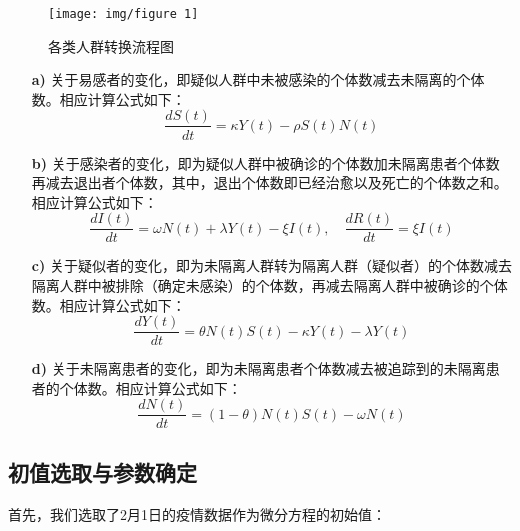 \documentclass[UTF8]{ctexart}
\begin{document}
		
		\begin{figure}[!htbp]\centering
		\texttt{[image: img/figure 1]} %
		\caption{各类人群转换流程图} %
		\label{fig:figure 1} %
		\end{figure}	
		
		
		
	
		
		\vspace{4pt}
		\begin{itemize}
			\item [\textbf{a)}]关于易感者的变化，即疑似人群中未被感染的个体数减去未隔离的个体数。相应计算公式如下：\vspace{1ex}
				\begin{equation}
				\frac{dS(t)}{dt}=\kappa Y(t)-\rho S(t)N(t)
				\end{equation}
				
				
				
			\item[\textbf{b)}]关于感染者的变化，即为疑似人群中被确诊的个体数加未隔离患者个体数再减去退出者个体数，其中，退出个体数即已经治愈以及死亡的个体数之和。相应计算公式如下：\vspace{1ex}
				\begin{equation}
				\frac{dI(t)}{dt}=\omega N(t)+\lambda Y(t)-\xi I(t),
				\quad	\frac{dR(t)}{dt}=\xi I(t)
				\end{equation}	


				
			\item[\textbf{c)}]关于疑似者的变化，即为未隔离人群转为隔离人群（疑似者）的个体数减去隔离人群中被排除（确定未感染）的个体数，再减去隔离人群中被确诊的个体数。相应计算公式如下：\vspace{1ex}
				\begin{equation}
				\frac{dY(t)}{dt}=\theta N(t)S(t)-\kappa Y(t)-\lambda Y(t)
				\end{equation}	
				
				
				
			\item[\textbf{d)}]关于未隔离患者的变化，即为未隔离患者个体数减去被追踪到的未隔离患者的个体数。相应计算公式如下：\vspace{1ex}
				\begin{equation}
				\frac{dN(t)}{dt}=(1-\theta) N(t)S(t)-\omega N(t)
				\end{equation}	
				
		\end{itemize}
		\newpage
			\subsection{初值选取与参数确定}
		首先，我们选取了2月1日的疫情数据作为微分方程的初始值：
\end{document}
